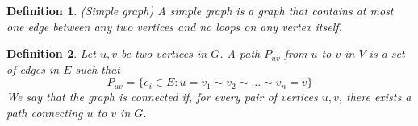 \documentclass{article}
\newtheorem{definition}{Definition}
\begin{document}
\begin{definition}(Simple graph)
    A simple graph is a graph that contains at most one edge between any two vertices and no loops on any vertex itself.
\end{definition}

\begin{definition}
   Let \( u, v \) be two vertices in \( G \). A path \( P_{uv} \) from \( u \) to \( v \) in \( V \) is a set of edges in \( E \) such that
\[
P_{uv} = \{ e_i \in E : u=v_1\sim v_2\sim ...\sim v_n=v \}
\]
We say that the graph is connected if, for every pair of vertices \( u, v \), there exists a path connecting \( u \) to \( v \) in \( G \).
\end{definition}




\end{document}
